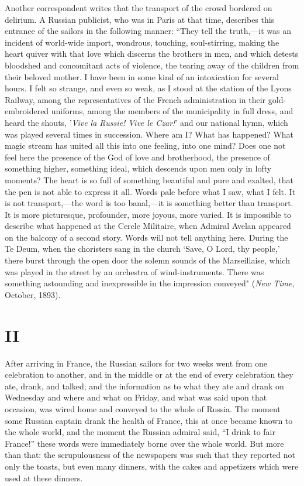 \documentclass{book}
\begin{document}
Another correspondent writes that the transport of the crowd bordered on delirium. A Russian publicist, who was in Paris at that time, describes this entrance of the sailors in the following manner: “They tell the truth,—it was an incident of world-wide import, wondrous, touching, soul-stirring, making the heart quiver with that love which discerns the brothers in men, and which detests bloodshed and concomitant acts of violence, the tearing away of the children from their beloved mother. I have been in some kind of an intoxication for several hours. I felt so strange, and even so weak, as I stood at the station of the Lyons Railway, among the representatives of the French administration in their gold-embroidered uniforms, among the members of the municipality in full dress, and heard the shouts, '\emph{Vive la Russie! Vive le Czar!}' and our national hymn, which was played several times in succession. Where am I? What has happened? What magic stream has united all this into one feeling, into one mind? Does one not feel here the presence of the God of love and brotherhood, the presence of something higher, something ideal, which descends upon men only in lofty moments? The heart is so full of something beautiful and pure and exalted, that the pen is not able to express it all. Words pale before what I saw, what I felt. It is not transport,—the word is too banal,—it is something better than transport. It is more picturesque, profounder, more joyous, more varied. It is impossible to describe what happened at the Cercle Militaire, when Admiral Avelan appeared on the balcony of a second story. Words will not tell anything here. During the Te Deum, when the choristers sang in the church ‘Save, O Lord, thy people,’ there burst through the open door the solemn sounds of the Marseillaise, which was played in the street by an orchestra of wind-instruments. There was something astounding and inexpressible in the impression conveyed" (\emph{New Time}, October, 1893).

\chapter{II}
\label{chapter-2}
After arriving in France, the Russian sailors for two weeks went from one celebration to another, and in the middle or at the end of every celebration they ate, drank, and talked; and the information as to what they ate and drank on Wednesday and where and what on Friday, and what was said upon that occasion, was wired home and conveyed to the whole of Russia. The moment some Russian captain drank the health of France, this at once became known to the whole world, and the moment the Russian admiral said, “I drink to fair France!” these words were immediately borne over the whole world. But more than that: the scrupulousness of the newspapers was such that they reported not only the toasts, but even many dinners, with the cakes and appetizers which were used at these dinners.
\end{document}
